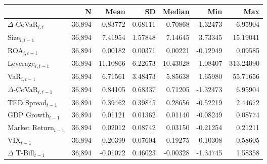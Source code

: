 \begin{tabular}{lrrrrrr}
  \hline
 & N & Mean & SD & Median & Min & Max \\ 
  \hline
$\Delta$-CoVaR$_{i,t}$ & 36,894 & 0.83772 & 0.68111 & 0.70868 & -1.32473 & 6.95904 \\ 
  Size$_{i,t-1}$ & 36,894 & 7.41954 & 1.57848 & 7.14645 & 3.73345 & 15.19041 \\ 
  ROA$_{i,t-1}$ & 36,894 & 0.00182 & 0.00371 & 0.00221 & -0.12949 & 0.09585 \\ 
  Leverage$_{i,t-1}$ & 36,894 & 11.10866 & 6.22673 & 10.43028 & 1.08407 & 313.24090 \\ 
  VaR$_{i,t-1}$ & 36,894 & 6.71561 & 3.48473 & 5.85638 & 1.65980 & 55.71656 \\ 
  $\Delta$-CoVaR$_{i,t-1}$ & 36,894 & 0.84105 & 0.68337 & 0.71205 & -1.32473 & 6.95904 \\ 
  TED Spread$_{t-1}$ & 36,894 & 0.39462 & 0.39845 & 0.28656 & -0.52219 & 2.44672 \\ 
  GDP Growth$_{t-1}$ & 36,894 & 0.01121 & 0.01362 & 0.01140 & -0.08249 & 0.08774 \\ 
  Market Return$_{t-1}$ & 36,894 & 0.02012 & 0.08742 & 0.03150 & -0.21254 & 0.21211 \\ 
  VIX$_{t-1}$ & 36,894 & 0.20399 & 0.07604 & 0.19275 & 0.10308 & 0.58605 \\ 
  $\Delta$ T-Bill$_{t-1}$ & 36,894 & -0.01072 & 0.46023 & -0.00328 & -1.34745 & 1.58358 \\ 
   \hline
\end{tabular}
